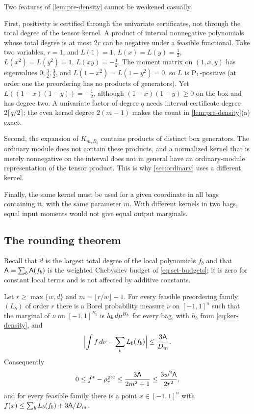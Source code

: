 \begin{remark}
\label{rem:ker-degree}
Two features of \cref{lem:pre-density} cannot be weakened casually.

First, positivity is certified through the univariate certificates, not
through the total degree of the tensor kernel. A product of interval
nonnegative polynomials whose total degree is at most $2r$ can be negative
under a feasible functional. Take two variables, $r=1$, and
$L(1)=1$, $L(x)=L(y)=\tfrac12$, $L(x^2)=L(y^2)=1$, $L(xy)=-\tfrac12$. The
moment matrix on $(1,x,y)$ has eigenvalues $0,\tfrac32,\tfrac32$, and
$L(1-x^2)=L(1-y^2)=0$, so $L$ is $\mathrm{P}_1$-positive (at order one the
preordering has no products of generators). Yet
$L((1-x)(1-y))=-\tfrac12$, although $(1-x)(1-y)\ge0$ on the box and has
degree two. A univariate factor of degree $q$ needs interval certificate
degree $2\lceil q/2\rceil$; the even kernel degree $2(m-1)$ makes the count
in \cref{lem:pre-density}(a) exact.

Second, the expansion of $K_{m,B_b}$ contains products of distinct box
generators. The ordinary module does not contain these products, and a
normalized kernel that is merely nonnegative on the interval does not in
general have an ordinary-module representation of the tensor product. This
is why \cref{sec:ordinary} uses a different kernel.

Finally, the same kernel must be used for a given coordinate in all bags
containing it, with the same parameter $m$. With different kernels in
two bags, equal input moments would not give equal output marginals.
\end{remark}

\subsection{The rounding theorem}\label{sec:ker-theorem}

Recall that $d$ is the largest total degree of the local polynomials $f_b$
and that $\mathsf{A}=\sum_b\mathsf{A}(f_b)$ is the weighted Chebyshev budget of
\eqref{eq:set-budgets}; it is zero for constant local terms and is not
affected by additive constants.

\begin{theorem}\label{thm:pre}
Let $r\ge\max\{w,d\}$ and $m=\lfloor r/w\rfloor+1$. For every feasible
preordering family $(L_b)$ of order $r$ there is a Borel probability
measure $\nu$ on $[-1,1]^n$ such that the marginal of $\nu$ on
$[-1,1]^{B_b}$ is $h_b\,d\mu^{B_b}$ for every bag, with $h_b$ from
\eqref{eq:ker-density}, and
\begin{equation}\label{eq:ker-rounding}
  \Bigl\lvert\int f\,d\nu-\sum_bL_b(f_b)\Bigr\rvert\le\frac{3\mathsf{A}}{D_m}.
\end{equation}
Consequently
\begin{equation}\label{eq:ker-gap}
  0\le f^{*}-\rho^{\mathrm{pre}}_r\le\frac{3\mathsf{A}}{2m^2+1}\le\frac{3w^2\mathsf{A}}{2r^2},
\end{equation}
and for every feasible family there is a point $x\in[-1,1]^n$ with
$f(x)\le\sum_bL_b(f_b)+3\mathsf{A}/D_m$.
\end{theorem}

